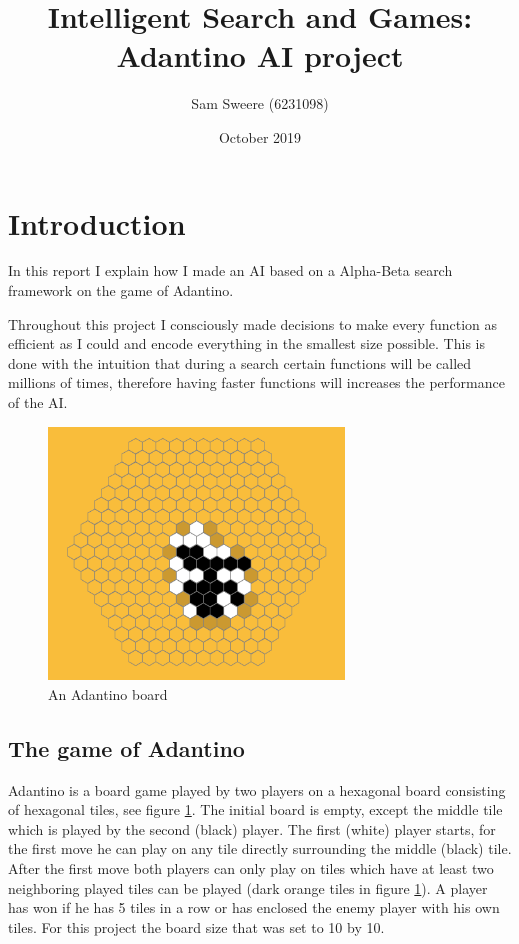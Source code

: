 \documentclass{article}
\title{Intelligent Search and Games: \\ Adantino AI project}
\author{Sam Sweere (6231098)}
\date{October 2019}
\begin{document}
\maketitle

\section{Introduction}
In this report I explain how I made an AI based on a Alpha-Beta search framework on the game of Adantino.

Throughout this project I consciously made decisions to make every function as efficient as I could and encode everything in the smallest size possible. This is done with the intuition that during a search certain functions will be called millions of times, therefore having faster functions will increases the performance of the AI. 

\begin{figure}[ht]
    \centering
    \includegraphics[width = 0.7\textwidth]{images/board.png}
    \caption{An Adantino board}
    \label{fig:board}
\end{figure}

\subsection{The game of Adantino}
\label{sec:adantinoGame}
Adantino is a board game played by two players on a hexagonal board consisting of hexagonal tiles, see figure \ref{fig:board}. The initial board is empty, except the middle tile which is played by the second (black) player. The first (white) player starts, for the first move he can play on any tile directly surrounding the middle (black) tile. After the first move both players can only play on tiles which have at least two neighboring played tiles can be played (dark orange tiles in figure \ref{fig:board}). A player has won if he has 5 tiles in a row or has enclosed the enemy player with his own tiles. For this project the board size that was set to 10 by 10.
\end{document}

